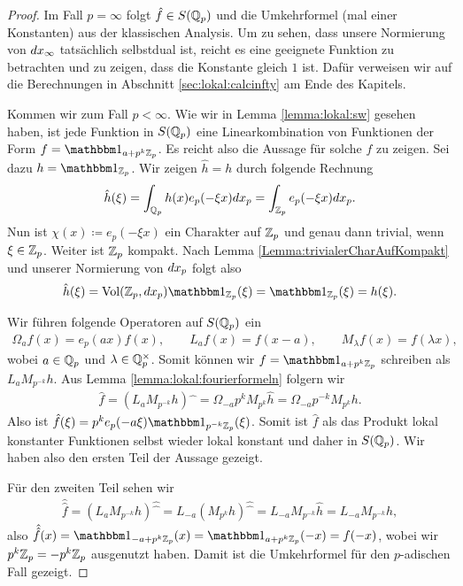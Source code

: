 		\begin{proof}
			Im Fall $p=\infty$ folgt $\hat{f} \in S({\mathbb{Q}_p})$ und die Umkehrformel (mal einer Konstanten) aus der klassischen Analysis.
			Um zu sehen, dass unsere Normierung von $d{x}_\infty$ tatsächlich selbstdual ist, reicht es eine geeignete Funktion zu betrachten und zu zeigen, dass die Konstante gleich $1$ ist. 
			Dafür verweisen wir auf die Berechnungen in Abschnitt \ref{sec:lokal:calcinfty} am Ende des Kapitels.
			
			Kommen wir zum Fall $p<\infty$. 
			Wie wir in Lemma \ref{lemma:lokal:sw} gesehen haben, ist jede Funktion in $S({\mathbb{Q}_p})$ eine Linearkombination von Funktionen der Form $f = \ind_{a+p^k\Zp}$. 
			Es reicht also die Aussage für solche $f$ zu zeigen.
			Sei dazu $h = \ind_{\Zp}$. Wir zeigen $\hat{h} = h$ durch folgende Rechnung
			\begin{align*}
				\hat{h}(\xi) = \int_{\mathbb{Q}_p} h(x) e_p (-\xi x) d{x}_p = \int_{\mathbb{Z}_p} e_p(-\xi x) d{x}_p.
			\end{align*}
			Nun ist $\chi(x)\coloneqq e_p(-\xi x)$ ein Charakter auf ${\mathbb{Z}_p}$ und genau dann trivial, wenn $\xi\in{\mathbb{Z}_p}$. 
			Weiter ist ${\mathbb{Z}_p}$ kompakt. 
			Nach Lemma \ref{Lemma:trivialerCharAufKompakt} und unserer Normierung von $d{x}_p$ folgt also
			\begin{align*}
				\hat{h}(\xi) = \Vol(\Zp, \dxp) \ind_\Zp(\xi) = \ind_\Zp(\xi) = h(\xi).
			\end{align*}
			
			Wir führen folgende Operatoren auf $S({\mathbb{Q}_p})$ ein
			\begin{align*}
				\Omega_a f(x) = e_p(ax)f(x), \qquad L_a f(x) = f(x-a),\qquad M_\lambda f(x) = f(\lambda x),
			\end{align*}
			wobei $a \in {\mathbb{Q}_p}$ und $\lambda \in \mathbb{Q}_p^\times$. 
			Somit können wir $f = \ind_{a+p^k\Zp}$ schreiben als $L_a M_{p^{-k}}h$. 
			Aus Lemma \ref{lemma:lokal:fourierformeln} folgern wir
			\begin{align*}
				\hat{f} = (L_a M_{p^{-k}}h)\widehat{\phantom{x}} = \Omega_{-a}p^{k}M_{p^k}\hat{h}=\Omega_{-a}p^{-k}M_{p^k}h.
			\end{align*}
			Also ist $\hat{f} (\xi) = p^k e_p(-a\xi)\ind_{p^{-k}\Zp}(\xi)$. 
			Somit ist $\hat{f}$ als das Produkt lokal konstanter Funktionen selbst wieder lokal konstant und daher in $S({\mathbb{Q}_p})$. 
			Wir haben also den ersten Teil der Aussage gezeigt.
			
			Für den zweiten Teil sehen wir
			\begin{align*}
				\hat{\hat{f}} = (L_a M_{p^{-k}}h)\widehat{\widehat{\phantom{x}}} = L_{-a} (M_{p^k}h)\widehat{\widehat{\phantom{x}}}=L_{-a}M_{p^{-k}}\hat{h} =L_{-a}M_{p^{-k}}h,
			\end{align*}
			also $\hat{\hat{f}} (x) = \ind_{-a+p^k\Zp} (x) = \ind_{a+p^k\Zp} (-x) = f(-x)$, wobei wir $p^k{\mathbb{Z}_p} = - p^k{\mathbb{Z}_p}$ ausgenutzt haben. 
			Damit ist die Umkehrformel für den $p$-adischen Fall gezeigt. 
		\end{proof}
		
